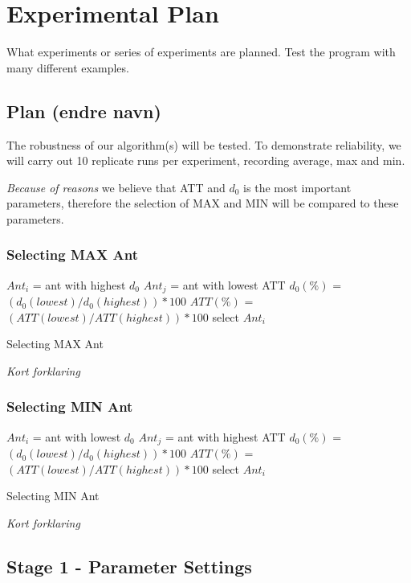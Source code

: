 \section{Experimental Plan}

What experiments or series of experiments are planned. Test the program with many different examples.


\subsection{Plan (endre navn)}
The robustness of our algorithm(s) will be tested. To demonstrate reliability, we will carry out 10 replicate runs per experiment, recording average, max and min.  

\emph{\color{red} Because of reasons }we believe that ATT and $d_0$ is the most important parameters, therefore the selection of MAX and MIN will be compared to these parameters.

\subsubsection{Selecting MAX Ant}

\begin{algorithm}[H]
$Ant_{i}$ = ant with highest $d_0$\;
$Ant_{j}$ = ant with lowest ATT\;
{
	$d_0(\%)$ = $(d_0(lowest) / d_0(highest))*100$\;
	$ATT(\%)$ = $(ATT(lowest) / ATT(highest))*100$\;
	{
		select $Ant_{i}$
	}
}
 \caption{Selecting MAX Ant}
\end{algorithm}

\emph{\color{red} Kort forklaring }

\subsubsection{Selecting MIN Ant}
\begin{algorithm}[H]
$Ant_{i}$ = ant with lowest $d_0$\;
$Ant_{j}$ = ant with highest ATT\;
{
	$d_0(\%)$ = $(d_0(lowest) / d_0(highest))*100$\;
	$ATT(\%)$ = $(ATT(lowest) / ATT(highest))*100$\;
	{
		select $Ant_{i}$
	}
}
 \caption{Selecting MIN Ant}
\end{algorithm}
\emph{\color{red} Kort forklaring }

\subsection{Stage 1 - Parameter Settings}

